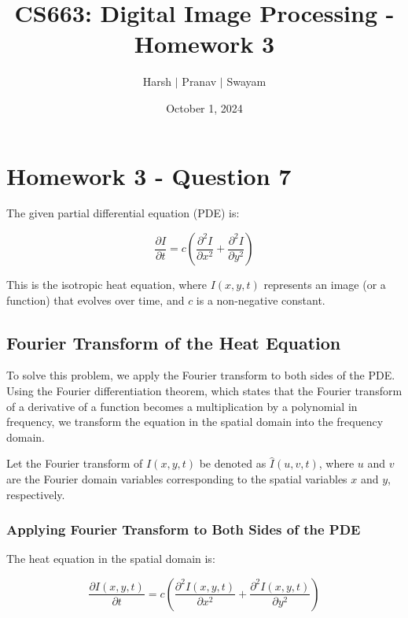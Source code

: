 \documentclass{article}
\title{CS663: Digital Image Processing - Homework 3}
\author{Harsh $\vert$ Pranav $\vert$ Swayam}
\date{October 1, 2024}
\begin{document}
\maketitle
\section{Homework 3 - Question 7}


The given partial differential equation (PDE) is:

\[
\frac{\partial I}{\partial t} = c \left( \frac{\partial^2 I}{\partial x^2} + \frac{\partial^2 I}{\partial y^2} \right)
\]

This is the isotropic heat equation, where \( I(x, y, t) \) represents an image (or a function) that evolves over time, and \( c \) is a non-negative constant.

\subsection*{Fourier Transform of the Heat Equation}

To solve this problem, we apply the Fourier transform to both sides of the PDE. Using the Fourier differentiation theorem, which states that the Fourier transform of a derivative of a function becomes a multiplication by a polynomial in frequency, we transform the equation in the spatial domain into the frequency domain.

Let the Fourier transform of \( I(x, y, t) \) be denoted as \( \hat{I}(u, v, t) \), where \( u \) and \( v \) are the Fourier domain variables corresponding to the spatial variables \( x \) and \( y \), respectively.

\subsubsection*{Applying Fourier Transform to Both Sides of the PDE}

The heat equation in the spatial domain is:

\[
\frac{\partial I(x, y, t)}{\partial t} = c \left( \frac{\partial^2 I(x, y, t)}{\partial x^2} + \frac{\partial^2 I(x, y, t)}{\partial y^2} \right)
\]
\end{document}
